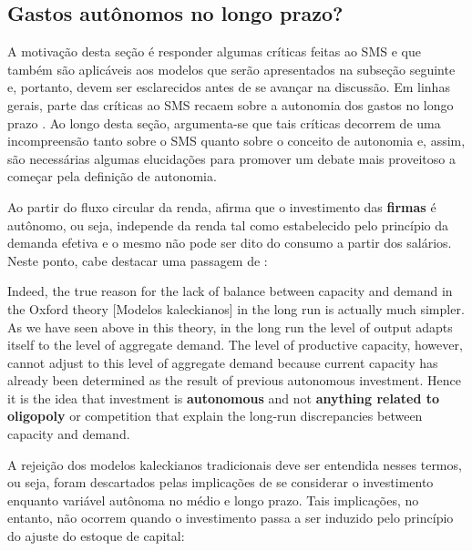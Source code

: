 \subsection{Gastos autônomos no longo prazo?}
\label{CrescimentoAutonomo}

A motivação desta seção é responder algumas críticas feitas ao SMS e que também são aplicáveis aos modelos que serão apresentados na subseção seguinte e, portanto, devem ser esclarecidos antes de se avançar na discussão.
Em linhas gerais, parte das críticas ao SMS recaem sobre a autonomia dos gastos no longo prazo \cites{skott_autonomous_2017}{nikiforos_comments_2018}. 
Ao longo desta seção, argumenta-se que tais críticas decorrem de uma incompreensão tanto sobre o SMS quanto sobre o conceito de autonomia e, assim, são necessárias algumas elucidações para promover um debate mais proveitoso a começar pela definição de autonomia.


Ao partir do fluxo circular da renda, \textcite{serrano_long_1995} afirma que o investimento das \textbf{firmas} é autônomo, ou seja, independe da renda tal como estabelecido pelo princípio da demanda efetiva e o mesmo não pode ser dito do consumo a partir dos salários. 
Neste ponto, cabe destacar uma passagem de \textcite[p.~120, grifos adicionados]{serrano_sraffian_1995}:

\begin{citacao}
	Indeed, the true reason for the lack of balance between capacity and demand in the Oxford theory [Modelos kaleckianos] in the long run is actually much simpler. As we have seen above in this theory, in the long run the level of output adapts itself to the level of aggregate demand. The level of productive capacity, however, cannot adjust to this level of aggregate demand because current capacity has already been determined as the result of previous autonomous investment. Hence it is the idea that investment is \textbf{autonomous} and not \textbf{anything related to oligopoly} or competition that explain the long-run discrepancies between capacity and demand.
\end{citacao}
A rejeição dos modelos kaleckianos tradicionais deve ser entendida nesses termos, ou seja, foram descartados pelas implicações de se considerar o investimento enquanto variável autônoma no médio e longo prazo.
Tais implicações, no entanto, não ocorrem quando o investimento passa a ser induzido pelo princípio do ajuste do estoque de capital:

